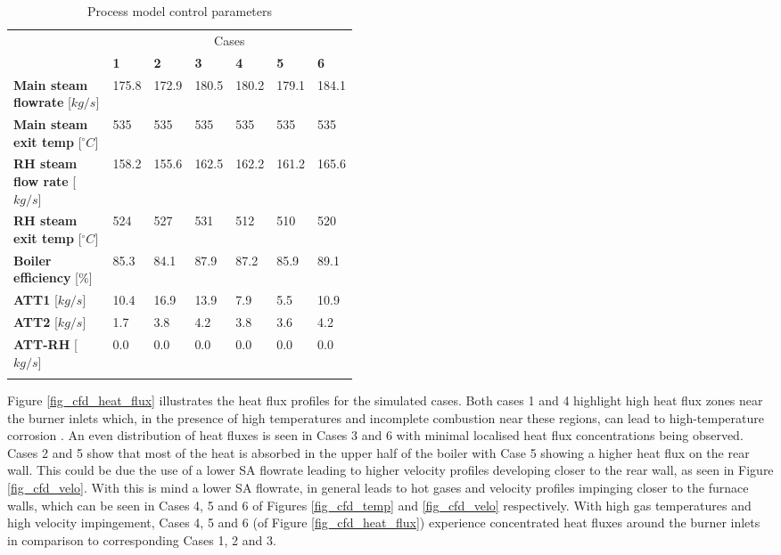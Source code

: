 \documentclass[review]{elsarticle}
\begin{document}
\begin{table}[h!]
\centering
\caption{Process model control parameters}
\vspace{2mm}
{\tabulinesep=1.2mm
\begin{tabularx}{\linewidth}{p{0.45\linewidth} XXXXXX}
\hline
&\multicolumn{6}{c}{Cases}\\
 & \textbf{1} & \textbf{2} & \textbf{3}& \textbf{4}&\textbf{5}&\textbf{6}\\
\hline
\textbf{Main steam flowrate} 	[$kg/s$]		&175.8&172.9&180.5&180.2&179.1&184.1 \\
\textbf{Main steam exit temp} 	[$^{\circ}C$]	&535& 535 &535&535 &535& 535\\
\textbf{RH steam flow rate} 	[$kg/s$]		&158.2&155.6&162.5&162.2&161.2&165.6\\
\textbf{RH steam exit temp} 	[$^{\circ}C$]	&524&527&531&512&510&520\\
\textbf{Boiler efficiency} 		[$\%$]			&85.3&84.1&87.9	&87.2&85.9&89.1\\
\textbf{ATT1} 		[$kg/s$]					&10.4&16.9&13.9&7.9&5.5&10.9\\
\textbf{ATT2} 		[$kg/s$]					&1.7&3.8&4.2&3.8&3.6&4.2\\
\textbf{ATT-RH} 		[$kg/s$]				&0.0&0.0&0.0&0.0&0.0&0.0\\
\hline
\label{tbl_process_parameters}
\end{tabularx}}
\end{table}

Figure \ref{fig_cfd_heat_flux} illustrates the heat flux profiles for the simulated cases. Both cases 1 and 4 highlight high heat flux zones near the burner inlets which, in the presence of high temperatures and incomplete combustion near these regions, can lead to high-temperature corrosion \cite{Du2017}. An even distribution of heat fluxes is seen in Cases 3 and 6 with minimal localised heat flux concentrations being observed. Cases 2 and 5 show that most of the heat is absorbed in the upper half of the boiler with Case 5 showing a higher heat flux on the rear wall. This could be due the use of a lower SA flowrate leading to higher velocity profiles developing closer to the rear wall, as seen in Figure \ref{fig_cfd_velo}. With this is mind a lower SA flowrate, in general leads to hot gases and velocity profiles impinging closer to the furnace walls, which can be seen in Cases 4, 5 and 6 of Figures \ref{fig_cfd_temp} and \ref{fig_cfd_velo} respectively. With high gas temperatures and high velocity impingement, Cases 4, 5 and 6 (of Figure \ref{fig_cfd_heat_flux}) experience concentrated heat fluxes around the burner inlets in comparison to corresponding Cases 1, 2 and 3.\\
\end{document}
